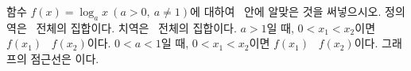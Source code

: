 함수 $f(x)=\log_a x\ (a>0,\ a\ne 1)$에 대하여 \blank\ 안에 알맞은 것을 써넣으시오.
 정의역은 \blank[4.5em]\ 전체의 집합이다.
 치역은 \blank[3em]\ 전체의 집합이다.
 $a>1$일 때, $0<x_1<x_2$이면 $f(x_1)$ \blank\ $f(x_2)$이다.
 $0<a<1$일 때, $0<x_1<x_2$이면 $f(x_1)$ \blank\ $f(x_2)$이다.
 그래프의 점근선은 \blank[3em]이다.
